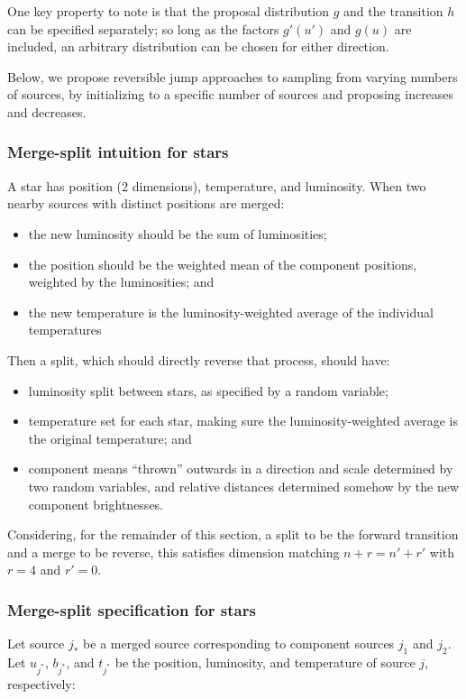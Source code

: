 \documentclass[11pt]{article}
\begin{document}
One key property to note is that the proposal distribution $g$ and
the transition $h$ can be specified separately; so long as the factors
$g'\left(u'\right)$ and $g\left(u\right)$ are included, an arbitrary
distribution can be chosen for either direction.

Below, we propose reversible jump approaches to sampling from varying
numbers of sources, by initializing to a specific number of sources
and proposing increases and decreases.


\subsubsection{Merge-split intuition for stars}

A star has position (2 dimensions), temperature, and luminosity.
When two nearby sources with distinct positions are merged:
\begin{itemize}
\item the new luminosity should be the sum of luminosities;
\item the position should be the weighted mean of the component positions,
weighted by the luminosities; and
\item the new temperature is the luminosity-weighted average of the
individual temperatures
\end{itemize}
Then a split, which should directly reverse that process, should have:
\begin{itemize}
\item luminosity split between stars, as specified by a random variable;
\item temperature set for each star, making sure the luminosity-weighted average
is the original temperature; and
\item component means {}``thrown'' outwards in a direction and scale determined
by two random variables, and relative distances determined somehow
by the new component brightnesses.
\end{itemize}
Considering, for the remainder of this section, a split to be the
forward transition and a merge to be reverse, this satisfies dimension
matching $n+r=n'+r'$ with $r=4$ and $r'=0$.


\subsubsection{Merge-split specification for stars\label{sub:merge-split-specification}}

Let source $j_{*}$ be a merged source corresponding to component
sources $j_{1}$ and $j_{2}$. Let $u_{j^*}$, $b_{j^*}$, and $t_{j^*}$
be the position, luminosity, and temperature of source $j$,
respectively:
\end{document}
